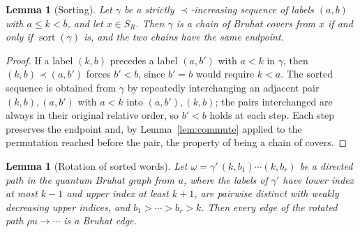 \documentclass[11pt]{article}
\newtheorem{lemma}[proposition]{Lemma}
\begin{document}
\begin{lemma}[Sorting]\label{lem:sort}
Let $\gamma$ be a strictly $\prec$-increasing sequence of labels
$(a,b)$ with $a\leq k<b$, and let $x\in S_R$. Then $\gamma$ is a chain
of Bruhat covers from $x$ if and only if $\operatorname{sort}(\gamma)$
is, and the two chains have the same endpoint.
\end{lemma}

\begin{proof}
If a label $(k,b)$ precedes a label $(a,b')$ with $a<k$ in $\gamma$,
then $(k,b)\prec(a,b')$ forces $b'<b$, since $b'=b$ would require
$k<a$. The sorted sequence is obtained from $\gamma$ by repeatedly
interchanging an adjacent pair $(k,b),(a,b')$ with $a<k$ into
$(a,b'),(k,b)$; the pairs interchanged are always in their original
relative order, so $b'<b$ holds at each step. Each step preserves the
endpoint and, by Lemma~\ref{lem:commute} applied to the permutation
reached before the pair, the property of being a chain of covers.
\end{proof}

\begin{lemma}[Rotation of sorted words]\label{lem:rotate-sorted}
Let $\omega=\gamma'\,(k,b_1)\cdots(k,b_r)$ be a directed path in the
quantum Bruhat graph from $u$, where the labels of $\gamma'$ have
lower index at most $k-1$ and upper index at least $k+1$, are
pairwise distinct with weakly decreasing upper indices, and
$b_1>\cdots>b_r>k$. Then every edge of the rotated path
$\rho u\to\cdots$ is a Bruhat edge.
\end{lemma}
\end{document}
